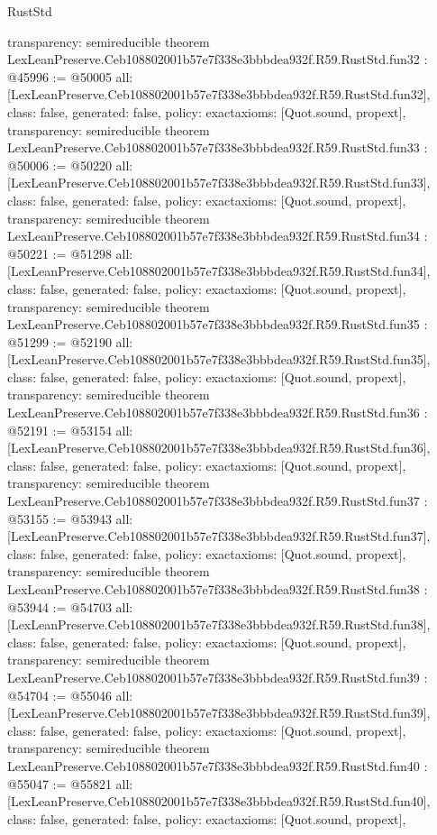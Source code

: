 \begin{lexlean}{RustStd}
\begin{coremodule}
{  transparency: semireducible
}
theorem LexLeanPreserve.Ceb108802001b57e7f338e3bbbdea932f.R59.RustStd.fun32 : @45996 := @50005 {
  all: [LexLeanPreserve.Ceb108802001b57e7f338e3bbbdea932f.R59.RustStd.fun32],
  class: false,
  generated: false,
  policy: exact{axioms: [Quot.sound, propext]},
  transparency: semireducible
}
theorem LexLeanPreserve.Ceb108802001b57e7f338e3bbbdea932f.R59.RustStd.fun33 : @50006 := @50220 {
  all: [LexLeanPreserve.Ceb108802001b57e7f338e3bbbdea932f.R59.RustStd.fun33],
  class: false,
  generated: false,
  policy: exact{axioms: [Quot.sound, propext]},
  transparency: semireducible
}
theorem LexLeanPreserve.Ceb108802001b57e7f338e3bbbdea932f.R59.RustStd.fun34 : @50221 := @51298 {
  all: [LexLeanPreserve.Ceb108802001b57e7f338e3bbbdea932f.R59.RustStd.fun34],
  class: false,
  generated: false,
  policy: exact{axioms: [Quot.sound, propext]},
  transparency: semireducible
}
theorem LexLeanPreserve.Ceb108802001b57e7f338e3bbbdea932f.R59.RustStd.fun35 : @51299 := @52190 {
  all: [LexLeanPreserve.Ceb108802001b57e7f338e3bbbdea932f.R59.RustStd.fun35],
  class: false,
  generated: false,
  policy: exact{axioms: [Quot.sound, propext]},
  transparency: semireducible
}
theorem LexLeanPreserve.Ceb108802001b57e7f338e3bbbdea932f.R59.RustStd.fun36 : @52191 := @53154 {
  all: [LexLeanPreserve.Ceb108802001b57e7f338e3bbbdea932f.R59.RustStd.fun36],
  class: false,
  generated: false,
  policy: exact{axioms: [Quot.sound, propext]},
  transparency: semireducible
}
theorem LexLeanPreserve.Ceb108802001b57e7f338e3bbbdea932f.R59.RustStd.fun37 : @53155 := @53943 {
  all: [LexLeanPreserve.Ceb108802001b57e7f338e3bbbdea932f.R59.RustStd.fun37],
  class: false,
  generated: false,
  policy: exact{axioms: [Quot.sound, propext]},
  transparency: semireducible
}
theorem LexLeanPreserve.Ceb108802001b57e7f338e3bbbdea932f.R59.RustStd.fun38 : @53944 := @54703 {
  all: [LexLeanPreserve.Ceb108802001b57e7f338e3bbbdea932f.R59.RustStd.fun38],
  class: false,
  generated: false,
  policy: exact{axioms: [Quot.sound, propext]},
  transparency: semireducible
}
theorem LexLeanPreserve.Ceb108802001b57e7f338e3bbbdea932f.R59.RustStd.fun39 : @54704 := @55046 {
  all: [LexLeanPreserve.Ceb108802001b57e7f338e3bbbdea932f.R59.RustStd.fun39],
  class: false,
  generated: false,
  policy: exact{axioms: [Quot.sound, propext]},
  transparency: semireducible
}
theorem LexLeanPreserve.Ceb108802001b57e7f338e3bbbdea932f.R59.RustStd.fun40 : @55047 := @55821 {
  all: [LexLeanPreserve.Ceb108802001b57e7f338e3bbbdea932f.R59.RustStd.fun40],
  class: false,
  generated: false,
  policy: exact{axioms: [Quot.sound, propext]},
}
\end{coremodule}
\end{lexlean}
